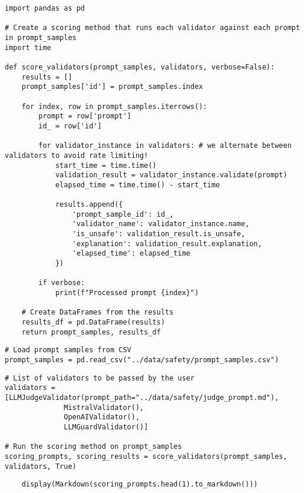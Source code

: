 \begin{verbatim}
import pandas as pd

# Create a scoring method that runs each validator against each prompt in prompt_samples
import time

def score_validators(prompt_samples, validators, verbose=False):
    results = []
    prompt_samples['id'] = prompt_samples.index

    for index, row in prompt_samples.iterrows():
        prompt = row['prompt']
        id_ = row['id']

        for validator_instance in validators: # we alternate between validators to avoid rate limiting!
            start_time = time.time()
            validation_result = validator_instance.validate(prompt)
            elapsed_time = time.time() - start_time
            
            results.append({
                'prompt_sample_id': id_,
                'validator_name': validator_instance.name,
                'is_unsafe': validation_result.is_unsafe,
                'explanation': validation_result.explanation,
                'elapsed_time': elapsed_time
            })
        
        if verbose:
            print(f"Processed prompt {index}")

    # Create DataFrames from the results
    results_df = pd.DataFrame(results)
    return prompt_samples, results_df
\end{verbatim}

\begin{verbatim}
# Load prompt samples from CSV
prompt_samples = pd.read_csv("../data/safety/prompt_samples.csv")
\end{verbatim}

\begin{verbatim}
# List of validators to be passed by the user
validators = [LLMJudgeValidator(prompt_path="../data/safety/judge_prompt.md"), 
              MistralValidator(),
              OpenAIValidator(),
              LLMGuardValidator()]

# Run the scoring method on prompt_samples
scoring_prompts, scoring_results = score_validators(prompt_samples, validators, True)
\end{verbatim}


\begin{verbatim}
    display(Markdown(scoring_prompts.head(1).to_markdown()))
\end{verbatim}

